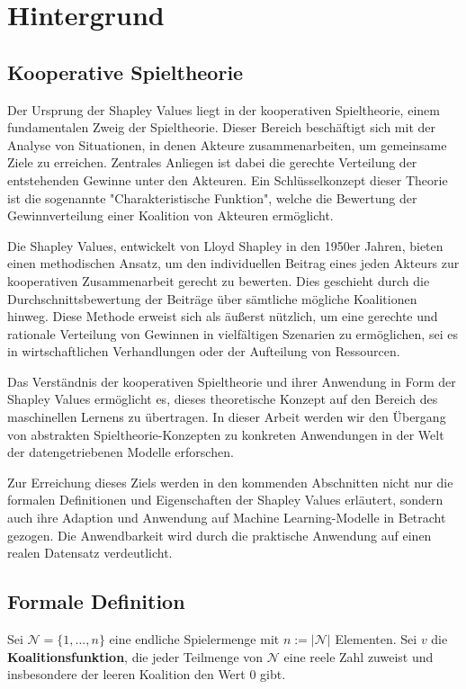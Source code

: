 \chapter{Hintergrund}


\section{Kooperative Spieltheorie}

Der Ursprung der Shapley Values liegt in der kooperativen Spieltheorie, einem fundamentalen Zweig der Spieltheorie. Dieser Bereich beschäftigt sich mit der Analyse von Situationen, in denen Akteure zusammenarbeiten, um gemeinsame Ziele zu erreichen. Zentrales Anliegen ist dabei die gerechte Verteilung der entstehenden Gewinne unter den Akteuren. Ein Schlüsselkonzept dieser Theorie ist die sogenannte "Charakteristische Funktion", welche die Bewertung der Gewinnverteilung einer Koalition von Akteuren ermöglicht.

Die Shapley Values, entwickelt von Lloyd Shapley in den 1950er Jahren, bieten einen methodischen Ansatz, um den individuellen Beitrag eines jeden Akteurs zur kooperativen Zusammenarbeit gerecht zu bewerten. Dies geschieht durch die Durchschnittsbewertung der Beiträge über sämtliche mögliche Koalitionen hinweg. Diese Methode erweist sich als äußerst nützlich, um eine gerechte und rationale Verteilung von Gewinnen in vielfältigen Szenarien zu ermöglichen, sei es in wirtschaftlichen Verhandlungen oder der Aufteilung von Ressourcen.

Das Verständnis der kooperativen Spieltheorie und ihrer Anwendung in Form der Shapley Values ermöglicht es, dieses theoretische Konzept auf den Bereich des maschinellen Lernens zu übertragen. In dieser Arbeit werden wir den Übergang von abstrakten Spieltheorie-Konzepten zu konkreten Anwendungen in der Welt der datengetriebenen Modelle erforschen.

Zur Erreichung dieses Ziels werden in den kommenden Abschnitten nicht nur die formalen Definitionen und Eigenschaften der Shapley Values erläutert, sondern auch ihre Adaption und Anwendung auf Machine Learning-Modelle in Betracht gezogen. Die Anwendbarkeit wird durch die praktische Anwendung auf einen realen Datensatz verdeutlicht.

\section{Formale Definition}

Sei $\mathcal{N} = \{1, \ldots, n\}$ eine endliche Spielermenge mit $n := |\mathcal{N}|$ Elementen. Sei $v$ die \textbf{Koalitionsfunktion}, die jeder Teilmenge von $\mathcal{N}$ eine reele Zahl zuweist und insbesondere der leeren Koalition den Wert $0$ gibt. 

